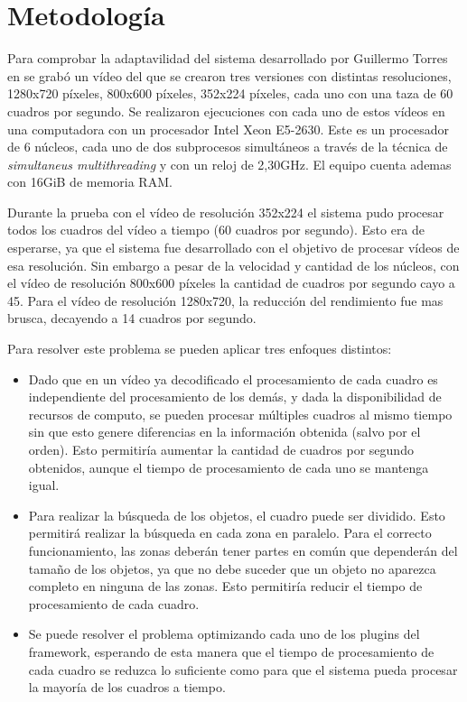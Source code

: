 
\section{Metodología}

Para comprobar la adaptavilidad del sistema desarrollado por Guillermo Torres en
\cite{torres2014} se grabó un vídeo del que se crearon tres versiones con
distintas resoluciones, 1280x720 píxeles, 800x600 píxeles, 352x224 píxeles, cada
uno con una taza de 60 cuadros por segundo. Se realizaron ejecuciones con cada
uno de estos vídeos en una computadora con un procesador Intel Xeon E5-2630.
Este es un procesador de 6 núcleos, cada uno de dos subprocesos simultáneos a
través de la técnica de \emph{simultaneus multithreading} y con un reloj de
2,30GHz. El equipo cuenta ademas con 16GiB de memoria RAM.

Durante la prueba con el vídeo de resolución 352x224 el sistema pudo procesar
todos los cuadros del vídeo a tiempo (60 cuadros por segundo). Esto era de
esperarse, ya que el sistema fue desarrollado con el objetivo de procesar vídeos
de esa resolución. Sin embargo a pesar de la velocidad y cantidad de los
núcleos, con el vídeo de resolución 800x600 píxeles la cantidad de cuadros por
segundo cayo a 45. Para el vídeo de resolución 1280x720, la reducción del
rendimiento fue mas brusca, decayendo a 14 cuadros por segundo.

Para resolver este problema se pueden aplicar tres enfoques distintos:

\begin{itemize}

\item 	Dado que en un vídeo ya decodificado el procesamiento de cada cuadro es
	independiente del procesamiento de los demás, y dada la disponibilidad
	de recursos de computo, se pueden procesar múltiples cuadros al mismo
	tiempo sin que esto genere diferencias en la información obtenida (salvo
	por el orden). Esto permitiría aumentar la cantidad de cuadros por
	segundo obtenidos, aunque el tiempo de procesamiento de cada uno se
	mantenga igual.

\item	Para realizar la búsqueda de los objetos, el cuadro puede ser dividido.
	Esto permitirá realizar la búsqueda en cada zona en paralelo. Para el
	correcto funcionamiento, las zonas deberán tener partes en común que
	dependerán del tamaño de los objetos, ya que no debe suceder que un
	objeto no aparezca completo en ninguna de las zonas. Esto permitiría
	reducir el tiempo de procesamiento de cada cuadro.

\item	Se puede resolver el problema optimizando cada uno de los plugins del
	framework, esperando de esta manera que el tiempo de procesamiento de
	cada cuadro se reduzca lo suficiente como para que el sistema pueda
	procesar la mayoría de los cuadros a tiempo.

\end{itemize}

